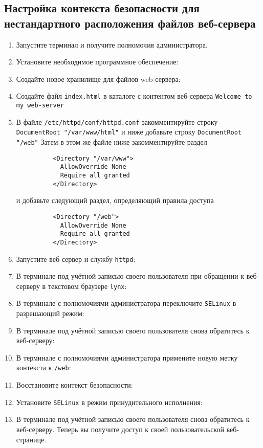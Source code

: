 \documentclass[12pt]{article}
\begin{document}
\subsection{Настройка контекста безопасности для нестандартного расположения файлов веб-сервера}
\begin{enumerate}
	\item Запустите терминал и получите полномочия администратора.
	\item Установите необходимое программное обеспечение:
	\item Создайте новое хранилище для файлов web-сервера:
	\item Создайте файл \texttt{index.html} в каталоге с контентом веб-сервера \texttt{Welcome to my web-server}
	\item В файле \texttt{/etc/httpd/conf/httpd.conf} закомментируйте строку \texttt{DocumentRoot "/var/www/html"} и ниже добавьте строку \texttt{DocumentRoot "/web"} Затем в этом же файле ниже закомментируйте раздел \\
	      \begin{verbatim}
          <Directory "/var/www">
            AllowOverride None
            Require all granted
          </Directory>
        \end{verbatim}
	      и добавьте следующий раздел, определяющий правила доступа \\
	      \begin{verbatim}
          <Directory "/web">
            AllowOverride None
            Require all granted
          </Directory>
        \end{verbatim}
	\item Запустите веб-сервер и службу \texttt{httpd}:
	\item В терминале под учётной записью своего пользователя при обращении к веб-серверу в текстовом браузере \texttt{lynx}:
	\item В терминале с полномочиями администратора переключите \texttt{SELinux} в разрешающий режим:
	\item В терминале под учётной записью своего пользователя снова обратитесь к веб-серверу:
	\item В терминале с полномочиями администратора примените новую метку контекста к \texttt{/web}:
	\item Восстановите контекст безопасности:
	\item Установите \texttt{SELinux} в режим принудительного исполнения:
	\item В терминале под учётной записью своего пользователя снова обратитесь к веб-серверу. Теперь вы получите доступ к своей пользовательской веб-странице.
\end{enumerate}
\end{document}

